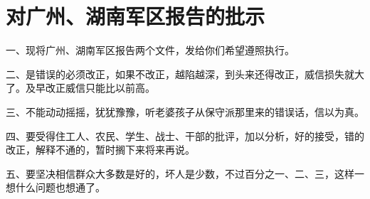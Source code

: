 \section[对广州、湖南军区报告的批示（一九六七年）]{对广州、湖南军区报告的批示}


一、现将广州、湖南军区报告两个文件，发给你们希望遵照执行。

二、是错误的必须改正，如果不改正，越陷越深，到头来还得改正，威信损失就大了。及早改正威信只能比以前高。

三、不能动动摇摇，犹犹豫豫，听老婆孩子从保守派那里来的错误话，信以为真。

四、要受得住工人、农民、学生、战士、干部的批评，加以分析，好的接受，错的改正，解释不通的，暂时搁下来将来再说。

五、要坚决相信群众大多数是好的，坏人是少数，不过百分之一、二、三，这样一想什么问题也想通了。


